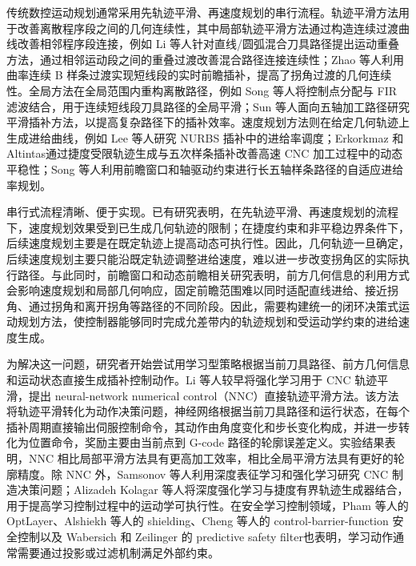 \documentclass[preprint,12pt]{elsarticle}
\begin{document}
传统数控运动规划通常采用先轨迹平滑、再速度规划的串行流程。轨迹平滑方法用于改善离散程序段之间的几何连续性，其中局部轨迹平滑方法通过构造连续过渡曲线改善相邻程序段连接，例如 Li 等人\cite{Li2023}针对直线/圆弧混合刀具路径提出运动重叠方法，通过相邻运动段之间的重叠过渡改善混合路径连接连续性；Zhao 等人\cite{Zhao2013}利用曲率连续 B 样条过渡实现短线段的实时前瞻插补，提高了拐角过渡的几何连续性。全局方法在全局范围内重构离散路径，例如 Song 等人\cite{Song2021}将控制点分配与 FIR 滤波结合，用于连续短线段刀具路径的全局平滑；Sun 等人\cite{Sun2024}面向五轴加工路径研究平滑插补方法，以提高复杂路径下的插补效率。速度规划方法则在给定几何轨迹上生成进给曲线，例如 Lee 等人\cite{Lee2011}研究 NURBS 插补中的进给率调度；Erkorkmaz 和 Altintas\cite{Erkorkmaz2001}通过捷度受限轨迹生成与五次样条插补改善高速 CNC 加工过程中的动态平稳性；Song 等人\cite{Song2020}利用前瞻窗口和轴驱动约束进行长五轴样条路径的自适应进给率规划。

串行式流程清晰、便于实现。已有研究表明，在先轨迹平滑、再速度规划的流程下，速度规划效果受到已生成几何轨迹的限制\cite{Zhang2021}；在捷度约束和非平稳边界条件下，后续速度规划主要是在既定轨迹上提高动态可执行性\cite{Zhang2026,WangAIM2025}。因此，几何轨迹一旦确定，后续速度规划主要只能沿既定轨迹调整进给速度，难以进一步改变拐角区的实际执行路径。与此同时，前瞻窗口和动态前瞻相关研究表明，前方几何信息的利用方式会影响速度规划和局部几何响应，固定前瞻范围难以同时适配直线进给、接近拐角、通过拐角和离开拐角等路径的不同阶段\cite{Song2020,Zhong2025}。因此，需要构建统一的闭环决策式运动规划方法，使控制器能够同时完成允差带内的轨迹规划和受运动学约束的进给速度生成。

为解决这一问题，研究者开始尝试用学习型策略根据当前刀具路径、前方几何信息和运动状态直接生成插补控制动作。Li 等人较早将强化学习用于 CNC 轨迹平滑，提出 neural-network numerical control（NNC）直接轨迹平滑方法\cite{Li2020}。该方法将轨迹平滑转化为动作决策问题，神经网络根据当前刀具路径和运行状态，在每个插补周期直接输出伺服控制命令，其动作由角度变化和步长变化构成，并进一步转化为位置命令，奖励主要由当前点到 G-code 路径的轮廓误差定义。实验结果表明，NNC 相比局部平滑方法具有更高加工效率，相比全局平滑方法具有更好的轮廓精度。除 NNC 外，Samsonov 等人利用深度表征学习和强化学习研究 CNC 制造决策问题\cite{Samsonov2023}；Alizadeh Kolagar 等人将深度强化学习与捷度有界轨迹生成器结合，用于提高学习控制过程中的运动学可执行性\cite{Alizadeh2025}。在安全学习控制领域，Pham 等人的 OptLayer\cite{Pham2018}、Alshiekh 等人的 shielding\cite{Alshiekh2018}、Cheng 等人的 control-barrier-function 安全控制\cite{Cheng2019}以及 Wabersich 和 Zeilinger 的 predictive safety filter\cite{Wabersich2021}也表明，学习动作通常需要通过投影或过滤机制满足外部约束。
\end{document}
